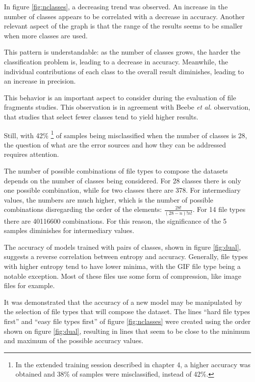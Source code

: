 

In figure \ref{fig:nclasses}, a decreasing trend was observed. An increase in the number of classes appears to be  correlated with a decrease in accuracy. Another relevant aspect of the graph is that the range of the results seems to be smaller when more classes are used.  

This pattern is understandable: as the number of classes grows, the harder the classification problem is, leading to a decrease in accuracy. Meanwhile, the individual contributions of each class to the overall result diminishes, leading to an increase in precision.

This behavior is an important aspect to consider during the evaluation of file fragments studies. This observation is in agreement with Beebe \textit{et al.} \cite{beebe_sceadan:_2013} observation, that studies that select fewer classes tend to yield higher results. 

Still, with 42\% \footnote{In the extended training session described in chapter 4, a higher accuracy was obtained and 38\% of samples were misclassified, instead of 42\%.} of samples being misclassified when the number of classes is 28, the question of what are the error sources and how they can be addressed requires attention.

The number of possible combinations of file types to compose the datasets depends on the number of classes being considered. For 28 classes there is only one possible combination, while for two classes there are 378. For intermediary values, the numbers are much higher, which is the number of possible combinations disregarding the order of the elements: $ \frac{28!}{(28-n)!n!}$. For 14 file types there are 40116600 combinations. For this reason, the significance of the 5 samples diminishes for intermediary values.


The accuracy of models trained with pairs of classes, shown in figure \ref{fig:dual}, suggests a reverse correlation between entropy and accuracy.  Generally, file types with higher entropy tend to have lower minima, with the GIF file type being a notable exception. Most of these files use some form of compression, like image files for example.

It was demonstrated that the accuracy of a new model may be manipulated by the selection of file types that will compose the dataset. The lines ``hard file types first'' and ``easy file types first'' of figure \ref{fig:nclasses} were created using the order shown on figure \ref{fig:dual}, resulting in lines that seem to be close to the minimum and maximum of the possible accuracy values. 

